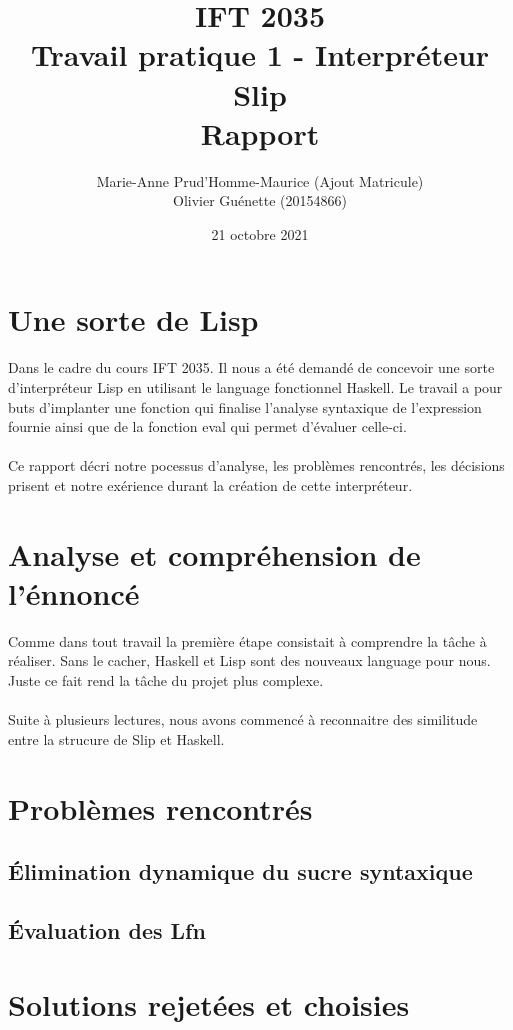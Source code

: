 \documentclass[12pt, letterpaper]{article}
\title{IFT 2035 \\ Travail pratique 1 - Interpréteur Slip \\ Rapport }
\author{ Marie-Anne Prud'Homme-Maurice (Ajout Matricule) 
\\ Olivier Guénette (20154866)}
\date{21 octobre 2021}
\begin{document}
\maketitle

\section*{Une sorte de Lisp}

Dans le cadre du cours IFT 2035. Il nous a été demandé de concevoir une sorte
d'interpréteur Lisp en utilisant le language fonctionnel Haskell. Le travail
a pour buts d'implanter une fonction qui finalise l'analyse syntaxique de
l'expression fournie ainsi que de la fonction eval qui permet d'évaluer
celle-ci.
\\
\\
Ce rapport décri notre pocessus d'analyse, les problèmes rencontrés,
les décisions prisent et notre exérience durant la création de
cette interpréteur.

\section*{Analyse et compréhension de l'énnoncé}

Comme dans tout travail la première étape consistait à comprendre la tâche à
réaliser.  Sans le cacher, Haskell et Lisp sont des nouveaux language pour nous.
Juste ce fait rend la tâche du projet plus complexe.
\\
\\
Suite à plusieurs lectures, nous avons commencé à reconnaitre des similitude entre
la strucure de Slip et Haskell.


\section*{Problèmes rencontrés}

\subsection*{Élimination dynamique du sucre syntaxique}

\subsection*{Évaluation des Lfn}

\section*{Solutions rejetées et choisies}
\end{document}
